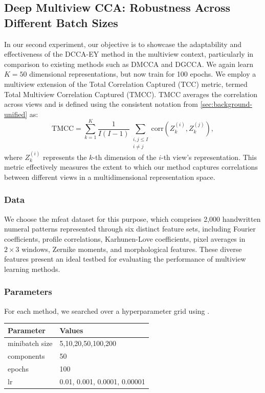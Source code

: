 \subsection{Deep Multiview CCA: Robustness Across Different Batch Sizes}
In our second experiment, our objective is to showcase the adaptability and effectiveness of the DCCA-EY method in the multiview context, particularly in comparison to existing methods such as DMCCA and DGCCA.
We again learn $K=50$ dimensional representations, but now train for 100 epochs.
We employ a multiview extension of the Total Correlation Captured (TCC) metric, termed Total Multiview Correlation Captured (TMCC). TMCC averages the correlation across views and is defined using the consistent notation from \cref{sec:background-unified} as:
\[
    \text{TMCC} = \sum_{k=1}^{K} \frac{1}{I(I-1)} \sum_{\substack{i,j \leq I \\ i \neq j}} \text{corr}(Z_k^{(i)}, Z_k^{(j)}),
\]
where \( Z_k^{(i)} \) represents the \( k \)-th dimension of the \( i \)-th view's representation.
This metric effectively measures the extent to which our method captures correlations between different views in a multidimensional representation space.

\subsubsection{Data} We choose the mfeat dataset for this purpose, which comprises 2,000 handwritten numeral patterns represented through six distinct feature sets, including Fourier coefficients, profile correlations, Karhunen-Love coefficients, pixel averages in \(2 \times 3\) windows, Zernike moments, and morphological features.
These diverse features present an ideal testbed for evaluating the performance of multiview learning methods.

\subsubsection{Parameters} For each method, we searched over a hyperparameter grid using \citet{wandb}.

\begin{table}[h!]
    \centering
    \begin{tabular}{|l|l|}
        \hline Parameter      & Values                       \\
        \hline minibatch size & 5,10,20,50,100,200           \\
        \hline components     & 50                           \\
        \hline epochs         & 100                          \\
        \hline lr             & 0.01, 0.001, 0.0001, 0.00001 \\
        \hline
    \end{tabular}
\end{table}

